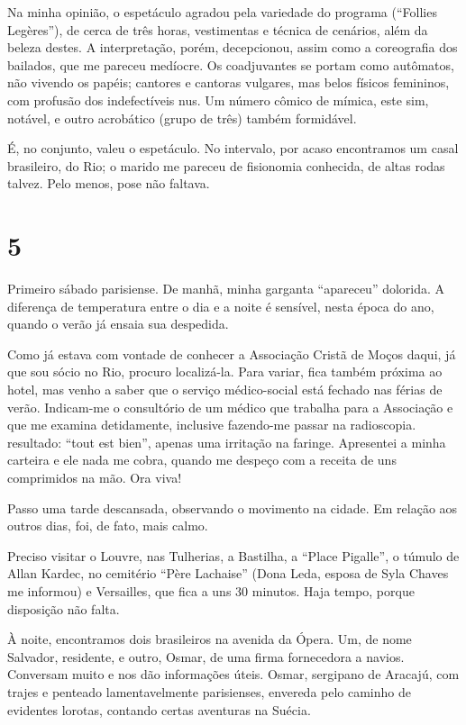 Na minha opinião, o espetáculo agradou pela variedade do programa (``Follies Legères''), de cerca de três horas, vestimentas e técnica de cenários, além da beleza destes. A interpretação, porém, decepcionou, assim como a coreografia dos bailados, que me pareceu medíocre. Os coadjuvantes se portam como autômatos, não vivendo os papéis; cantores e cantoras vulgares, mas belos físicos femininos, com profusão dos indefectíveis nus. Um número cômico de mímica, este sim, notável, e outro acrobático (grupo de três) também formidável.

É, no conjunto, valeu o espetáculo. No intervalo, por acaso encontramos um casal brasileiro, do Rio; o marido me pareceu de fisionomia conhecida, de altas rodas talvez. Pelo menos, pose não faltava.

\section*{5 \adfflatleafright {}}
Primeiro sábado parisiense. De manhã, minha garganta ``apareceu'' dolorida. A diferença de temperatura entre o dia e a noite é sensível, nesta época do ano, quando o verão já ensaia sua despedida.

Como já estava com vontade de conhecer a Associação Cristã de Moços daqui, já que sou sócio no Rio, procuro localizá-la. Para variar, fica também próxima ao hotel, mas venho a saber que o serviço médico-social está fechado nas férias de verão. Indicam-me o consultório de um médico que trabalha para a Associação e que me examina detidamente, inclusive fazendo-me passar na radioscopia. resultado: ``tout est bien'', apenas uma irritação na faringe. Apresentei a minha carteira e ele nada me cobra, quando me despeço com a receita de uns comprimidos na mão. Ora viva!

Passo uma tarde descansada, observando o movimento na cidade. Em relação aos outros dias, foi, de fato, mais calmo.

Preciso visitar o Louvre, nas Tulherias, a Bastilha, a ``Place Pigalle'', o túmulo de Allan Kardec, no cemitério ``Père Lachaise'' (Dona Leda, esposa de Syla Chaves me informou) e Versailles, que fica a uns 30 minutos. Haja tempo, porque disposição não falta.

À noite, encontramos dois brasileiros na avenida da Ópera. Um, de nome Salvador, residente, e outro, Osmar, de uma firma fornecedora a navios. Conversam muito e nos dão informações úteis. Osmar, sergipano de Aracajú, com trajes e penteado lamentavelmente parisienses, envereda pelo caminho de evidentes lorotas, contando certas aventuras na Suécia.

